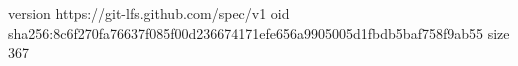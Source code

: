 version https://git-lfs.github.com/spec/v1
oid sha256:8c6f270fa76637f085f00d236674171efe656a9905005d1fbdb5baf758f9ab55
size 367
